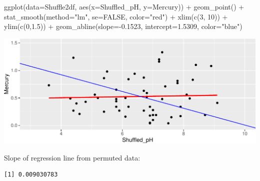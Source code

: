 \documentclass[
  letterpaper,
  DIV=11,
  numbers=noendperiod]{scrreprt}
\newenvironment{Shaded}{\begin{snugshade}}{\end{snugshade}}
\newcommand{\AttributeTok}[1]{\textcolor[rgb]{0.40,0.45,0.13}{#1}}
\newcommand{\ConstantTok}[1]{\textcolor[rgb]{0.56,0.35,0.01}{#1}}
\newcommand{\DecValTok}[1]{\textcolor[rgb]{0.68,0.00,0.00}{#1}}
\newcommand{\FloatTok}[1]{\textcolor[rgb]{0.68,0.00,0.00}{#1}}
\newcommand{\FunctionTok}[1]{\textcolor[rgb]{0.28,0.35,0.67}{#1}}
\newcommand{\NormalTok}[1]{\textcolor[rgb]{0.00,0.23,0.31}{#1}}
\newcommand{\OtherTok}[1]{\textcolor[rgb]{0.00,0.23,0.31}{#1}}
\newcommand{\SpecialCharTok}[1]{\textcolor[rgb]{0.37,0.37,0.37}{#1}}
\newcommand{\StringTok}[1]{\textcolor[rgb]{0.13,0.47,0.30}{#1}}
\begin{document}
\begin{Shaded}
\begin{Highlighting}[]
\FunctionTok{ggplot}\NormalTok{(}\AttributeTok{data=}\NormalTok{Shuffle2df, }\FunctionTok{aes}\NormalTok{(}\AttributeTok{x=}\NormalTok{Shuffled\_pH, }\AttributeTok{y=}\NormalTok{Mercury)) }\SpecialCharTok{+} 
  \FunctionTok{geom\_point}\NormalTok{() }\SpecialCharTok{+} \FunctionTok{stat\_smooth}\NormalTok{(}\AttributeTok{method=}\StringTok{"lm"}\NormalTok{, }\AttributeTok{se=}\ConstantTok{FALSE}\NormalTok{, }\AttributeTok{color=}\StringTok{"red"}\NormalTok{) }\SpecialCharTok{+} 
  \FunctionTok{xlim}\NormalTok{(}\FunctionTok{c}\NormalTok{(}\DecValTok{3}\NormalTok{, }\DecValTok{10}\NormalTok{)) }\SpecialCharTok{+} \FunctionTok{ylim}\NormalTok{(}\FunctionTok{c}\NormalTok{(}\DecValTok{0}\NormalTok{,}\FloatTok{1.5}\NormalTok{)) }\SpecialCharTok{+} 
  \FunctionTok{geom\_abline}\NormalTok{(}\AttributeTok{slope=}\SpecialCharTok{{-}}\FloatTok{0.1523}\NormalTok{, }\AttributeTok{intercept=}\FloatTok{1.5309}\NormalTok{, }\AttributeTok{color=}\StringTok{"blue"}\NormalTok{)}
\end{Highlighting}
\end{Shaded}

\includegraphics{Ch3_files/figure-pdf/unnamed-chunk-220-1.pdf}

Slope of regression line from permuted data:

\begin{Shaded}
\end{Shaded}

\begin{verbatim}
[1] 0.009030783
\end{verbatim}
\end{document}
